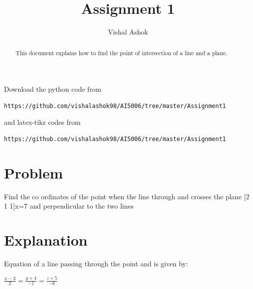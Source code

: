 \documentclass[journal,12pt,twocolumn]{IEEEtran}
\begin{document}
\renewcommand{\thefigure}{\theproblem}
\def\putbox#1#2#3{\makebox[0in][l]{\makebox[#1][l]{}\raisebox{\baselineskip}[0in][0in]{\raisebox{#2}[0in][0in]{#3}}}}
     \def\rightbox#1{\makebox[0in][r]{#1}}
     \def\centbox#1{\makebox[0in]{#1}}
     \def\topbox#1{\raisebox{-\baselineskip}[0in][0in]{#1}}
     \def\midbox#1{\raisebox{-0.5\baselineskip}[0in][0in]{#1}}
\vspace{3cm}
\title{Assignment 1}
\author{Vishal Ashok}
\maketitle
\newpage
\bigskip
\renewcommand{\thefigure}{\theenumi}
\renewcommand{\thetable}{\theenumi}
\begin{abstract}
This document explains how to find the point of intersection of a line and a plane.
\end{abstract}
Download the python code from 
%
\begin{lstlisting}
https://github.com/vishalashok98/AI5006/tree/master/Assignment1
\end{lstlisting}
%
and latex-tikz codes from 
%
\begin{lstlisting}
https://github.com/vishalashok98/AI5006/tree/master/Assignment1
\end{lstlisting}
%

\section{Problem}
Find the co ordinates of the point when the line through
 and  crosses the plane [2  1  1]x=7 and perpendicular to the two lines

	
	
\section{Explanation}
Equation of a line passing through the point  and  is given by:
\begin{center}

$\frac{x-3}{2} = \frac{y+4}{-1}= \frac{z+5}{-6}$ \label{eq:1}
\end{center}
\end{document}
